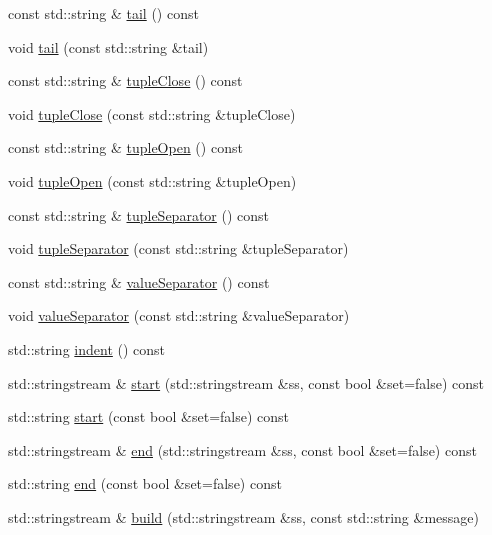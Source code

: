 \begin{DoxyCompactItemize}
const std\+::string \& \hyperlink{classStringFormater_aa28994ecf2e66952f6f4535c9b544d47}{tail} () const
\item 
void \hyperlink{classStringFormater_ab92f93d76b0f58560d8a8db124edd3ef}{tail} (const std\+::string \&tail)
\item 
const std\+::string \& \hyperlink{classStringFormater_ae87101d7a35f7317fe0e48023f9033ca}{tuple\+Close} () const
\item 
void \hyperlink{classStringFormater_ad0760f314079f6af19d09f45a0b77642}{tuple\+Close} (const std\+::string \&tuple\+Close)
\item 
const std\+::string \& \hyperlink{classStringFormater_a723672ca8ad990eebc181b051199f4e8}{tuple\+Open} () const
\item 
void \hyperlink{classStringFormater_ac9d4c3bfaa5baaf7dc97768a9068128a}{tuple\+Open} (const std\+::string \&tuple\+Open)
\item 
const std\+::string \& \hyperlink{classStringFormater_a9c1654f1f4e2f44a3bd8c0eff76f7d8f}{tuple\+Separator} () const
\item 
void \hyperlink{classStringFormater_a20c69db03bbd7bfff3154b560ff0106b}{tuple\+Separator} (const std\+::string \&tuple\+Separator)
\item 
const std\+::string \& \hyperlink{classStringFormater_a63ed3fb057158b3e96333f5d6761400a}{value\+Separator} () const
\item 
void \hyperlink{classStringFormater_aa39006dd16b8c4f2ef55c6898b4561db}{value\+Separator} (const std\+::string \&value\+Separator)
\item 
std\+::string \hyperlink{classStringFormater_a8a4422bdcbe498401aecb283c433d31d}{indent} () const
\item 
std\+::stringstream \& \hyperlink{classStringFormater_a4eda27368789110bef0e4c3401587efd}{start} (std\+::stringstream \&ss, const bool \&set=false) const
\item 
std\+::string \hyperlink{classStringFormater_a4685d33ea6f692029e79fa0e083253fd}{start} (const bool \&set=false) const
\item 
std\+::stringstream \& \hyperlink{classStringFormater_a63052da61a599fc14687f26b9d2f005b}{end} (std\+::stringstream \&ss, const bool \&set=false) const
\item 
std\+::string \hyperlink{classStringFormater_aae2d087c138d5bcf6bdb917f5a681ef3}{end} (const bool \&set=false) const
\item 
std\+::stringstream \& \hyperlink{classStringFormater_a4cc86d5e84a9d5006d5eb61eafe68690}{build} (std\+::stringstream \&ss, const std\+::string \&message)

\end{DoxyCompactItemize}
